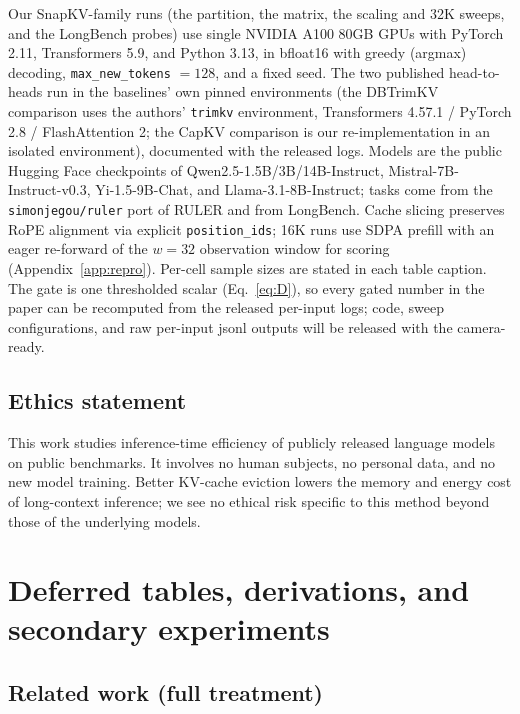 \documentclass{article}
\begin{document}
Our SnapKV-family runs (the partition, the matrix, the scaling and 32K
sweeps, and the LongBench probes) use single NVIDIA A100 80GB GPUs with
PyTorch 2.11, Transformers 5.9, and Python 3.13, in bfloat16 with greedy
(argmax) decoding, \texttt{max\_new\_tokens} $= 128$, and a fixed seed. The
two published head-to-heads run in the baselines' own pinned environments
(the DBTrimKV comparison uses the authors' \texttt{trimkv} environment,
Transformers 4.57.1 / PyTorch 2.8 / FlashAttention 2; the CapKV comparison is
our re-implementation in an isolated environment), documented with the released
logs. Models
are the public Hugging Face checkpoints of Qwen2.5-1.5B/3B/14B-Instruct,
Mistral-7B-Instruct-v0.3, Yi-1.5-9B-Chat, and Llama-3.1-8B-Instruct;
tasks come from the \texttt{simonjegou/ruler} port of RULER and from
LongBench. Cache slicing preserves RoPE alignment via explicit
\texttt{position\_ids}; 16K runs use SDPA prefill with an eager
re-forward of the $w = 32$ observation window for scoring
(Appendix~\ref{app:repro}). Per-cell sample sizes are stated in each
table caption. The gate is one thresholded scalar (Eq.~\eqref{eq:D}),
so every gated number in the paper can be recomputed from the released
per-input logs; code, sweep configurations, and raw per-input jsonl
outputs will be released with the camera-ready.

\subsection*{Ethics statement}

This work studies inference-time efficiency of publicly released
language models on public benchmarks. It involves no human subjects,
no personal data, and no new model training. Better KV-cache eviction
lowers the memory and energy cost of long-context inference; we see no
ethical risk specific to this method beyond those of the underlying
models.




\appendix

\section{Deferred tables, derivations, and secondary experiments}
\label{app:deferred}


\subsection{Related work (full treatment)}
\end{document}
